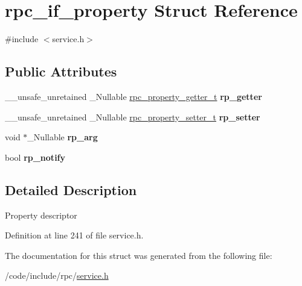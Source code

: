 \hypertarget{structrpc__if__property}{}\section{rpc\+\_\+if\+\_\+property Struct Reference}
\label{structrpc__if__property}


{\ttfamily \#include $<$service.\+h$>$}

\subsection*{Public Attributes}
\begin{DoxyCompactItemize}
\item 
\mbox{\label{structrpc__if__property_ae19b459a98e396cb5f6f8e4938d6c018}} 
\+\_\+\+\_\+unsafe\+\_\+unretained \+\_\+\+Nullable \hyperlink{service_8h_ab438f0c33f3f3876f1c9a23d62134f16}{rpc\+\_\+property\+\_\+getter\+\_\+t} {\bfseries rp\+\_\+getter}
\item 
\mbox{\label{structrpc__if__property_a45fe384e6ad2355ba81781fe16b9d421}} 
\+\_\+\+\_\+unsafe\+\_\+unretained \+\_\+\+Nullable \hyperlink{service_8h_aa8b38d8ab3bafe79a96edaebafe13b8d}{rpc\+\_\+property\+\_\+setter\+\_\+t} {\bfseries rp\+\_\+setter}
\item 
\mbox{\label{structrpc__if__property_a81d2953a7a4bdff1775330c29992546b}} 
void $\ast$\+\_\+\+Nullable {\bfseries rp\+\_\+arg}
\item 
\mbox{\label{structrpc__if__property_ac8c71dd42b3981bc522dc1bbb3534b39}} 
bool {\bfseries rp\+\_\+notify}
\end{DoxyCompactItemize}


\subsection{Detailed Description}
Property descriptor 

Definition at line 241 of file service.\+h.



The documentation for this struct was generated from the following file\+:\begin{DoxyCompactItemize}
\item 
/code/include/rpc/\hyperlink{service_8h}{service.\+h}\end{DoxyCompactItemize}
